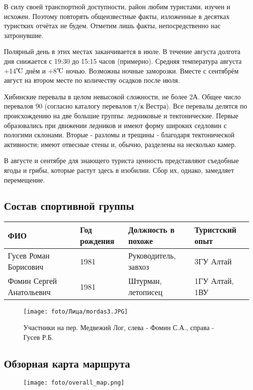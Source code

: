 В силу своей транспортной доступности, район любим туристами, изучен и исхожен.
Поэтому повторять общеизвестные факты, изложенные в десятках туристких отчётах не будем.
Отметим лишь факты, непосредственно нас затронувшие.

Полярный день в этих местах заканчивается в июле. В течение августа долгота дня снижается с
19:30 до 15:15 часов (примерно). Средняя температура августа +14$\tccentigrade$ днём и +8$\tccentigrade$ ночью.
Возможны ночные заморозки. Вместе с сентябрём август на втором месте по количеству осадков после июля.

Хибинские перевалы в целом невысокой сложности, не более 2А. Общее число перевалов 90 (согласно каталогу
перевалов т/к Вестра). Все перевалы делятся по происхождению на две большие группы: ледниковые и тектонические.
Первые образовались при движении ледников и имеют форму широких седловин с пологими склонами.
Вторые - разломы и трещины - благодаря тектонической активности;
имеют отвесные стены и, обычно, разделены на несколько камер.

В августе и сентябре для знающего туриста ценность представляют съедобные ягоды и грибы, которые растут здесь в изобилии.
Сбор их, однако, замедляет перемещение.

\subsection{Состав спортивной группы}
\begin{tabular}{|l|l|l|l|}
    \hline
    ФИО & Год рождения & Должность в похоже & Туристский опыт\\
    \hline
    Гусев Роман Борисович &
    1981 &
    Руководитель, завхоз &
	3ГУ Алтай
    \\
    \hline
    Фомин Сергей Анатольевич &
    1981 &
    Штурман, летописец &
	1ГУ Алтай, 1ВУ
    \\
    \hline
\end{tabular}

\begin{figure}[H]
    \texttt{[image: foto/Лица/mordas3.JPG]}
    \caption*{Участники на пер. Медвежий Лог, слева - Фомин С.А., справа - Гусев Р.Б.}
\end{figure}

\subsection{Обзорная карта маршрута}
\begin{figure}[H]
    \texttt{[image: foto/overall\_map.png]}
\end{figure}


